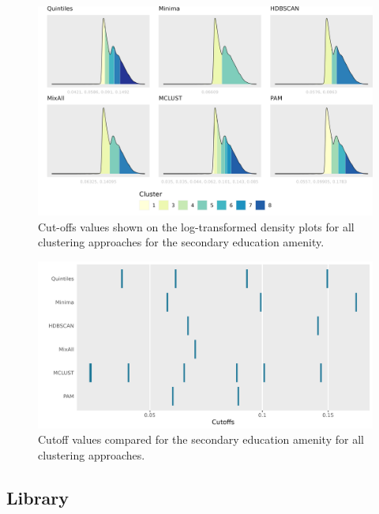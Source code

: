 \documentclass[11pt, a4paper]{article}
\begin{document}
\begin{figure}[H]
\centering
\includegraphics[width=\textwidth]{./cutoffs/by_amenity/Secondary Education_cutoffs.png}
\caption[Secondary education cutoffs]{Cut-offs values shown on the log-transformed density plots for all clustering approaches for the secondary education amenity.}\label{seceduccutoffs}
\end{figure}





\begin{figure}[H]
\centering
\includegraphics[width=\textwidth]{./cutoff_ticks/Secondary Education_ticks.png}
\caption[Secondary Education cutoff comparison]{Cutoff values compared for the secondary education amenity for all clustering approaches.}\label{seceducticks}
\end{figure}









\justifying
\subsection{Library}
\end{document}
